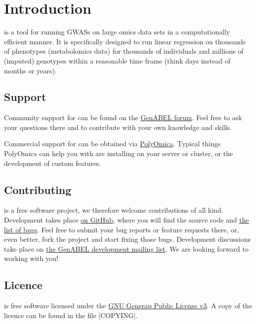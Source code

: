 \chapter{Introduction}
\oanomm is a tool for running \acp{GWAS} on large omics data sets in a
computationally efficient manner. It is specifically designed to run
linear regression on thousands of phenotypes (\eg metabolomics data)
for thousands of individuals and millions of (imputed) genotypes
within a reasonable time frame (think days instead of months or
years).

\section{Support}
Community support for \oanomm can be found on the
\href{http://forum.genabel.org}{GenABEL forum}. Feel free to ask your
questions there and to contribute with your own knowledge and skills.

Commercial support for \oanomm can be obtained via
\href{http://www.polyomica.com}{PolyOmica}. Typical things PolyOmica
can help you with are installing \oanomm on your server or
cluster, or the development of custom features.

\section{Contributing}
\oanomm is a free software project, we therefore welcome contributions
of all kind. Development takes place
\href{https://github.com/GenABEL-Project/OmicABELnoMM}{on GitHub},
where you will find the source code and
\href{https://github.com/GenABEL-Project/OmicABELnoMM/issues}{the list
  of bugs}. Feel free to submit your bug reports or feature requests
there, or, even better, fork the project and start fixing those bugs.
Development discussions take place on
\href{https://lists.r-forge.r-project.org/mailman/listinfo/genabel-devel}{the
  GenABEL development mailing list}. We are looking forward to working
with you!

\section{Licence}
\oanomm is free software licensed under the
\href{https://www.gnu.org/licenses/gpl.html}{GNU Generap Public
  License v3}. A copy of the licence can be found in the file
|COPYING|.



